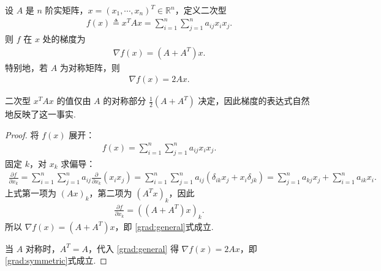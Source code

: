 \documentclass[../../main.tex]{subfiles}%
\begin{document}
\begin{proposition}\label{proposition:}
设 $A$ 是 $n$ 阶实矩阵，$x=(x_1,\cdots,x_n)^T\in\mathbb{R}^n$，定义二次型
\begin{align*}
f(x)\triangleq x^T A x=\sum_{i=1}^n\sum_{j=1}^n a_{ij}x_i x_j.
\end{align*}
则 $f$ 在 $x$ 处的梯度为
\begin{align}
\nabla f(x)=(A+A^T)x. \label{grad:general}
\end{align}
特别地，若 $A$ 为对称矩阵，则
\begin{align}
\nabla f(x)=2Ax. \label{grad:symmetric}
\end{align}
\end{proposition}
\begin{remark}
二次型 $x^T A x$ 的值仅由 $A$ 的对称部分 $\frac{1}{2}(A+A^T)$ 决定，因此梯度的表达式自然地反映了这一事实.
\end{remark}
\begin{proof}
将 $f(x)$ 展开：
\begin{align*}
f(x)=\sum_{i=1}^n\sum_{j=1}^n a_{ij}x_i x_j.
\end{align*}
固定 $k$，对 $x_k$ 求偏导：
\begin{align*}
\frac{\partial f}{\partial x_k}
=\sum_{i=1}^n\sum_{j=1}^n a_{ij}\frac{\partial}{\partial x_k}(x_i x_j) 
=\sum_{i=1}^n\sum_{j=1}^n a_{ij}(\delta_{ik}x_j+x_i\delta_{jk}) 
=\sum_{j=1}^n a_{kj}x_j+\sum_{i=1}^n a_{ik}x_i.
\end{align*}
上式第一项为 $(Ax)_k$，第二项为 $(A^T x)_k$，因此
\begin{align*}
\frac{\partial f}{\partial x_k}=((A+A^T)x)_k.
\end{align*}
所以 $\nabla f(x)=(A+A^T)x$，即 \eqref{grad:general}式成立.

当 $A$ 对称时，$A^T=A$，代入 \eqref{grad:general} 得 $\nabla f(x)=2Ax$，即 \eqref{grad:symmetric}式成立.
\end{proof}
\end{document}

